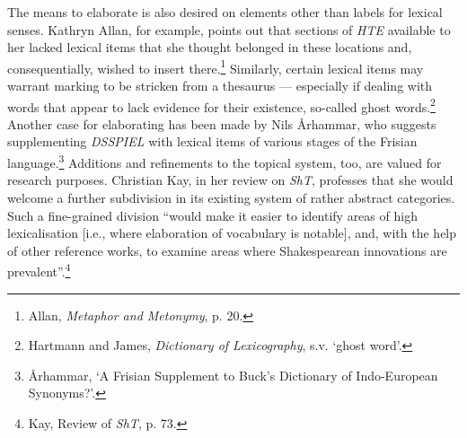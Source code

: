 The means to elaborate is also desired on elements other than labels for lexical senses. Kathryn Allan, for example, points out that sections of \textit{HTE} available to her lacked lexical items that she thought belonged in these locations and, consequentially, wished to insert there.\footnote{Allan, \textit{Metaphor and Metonymy}, p. 20.} Similarly, certain lexical items may warrant marking to be stricken from a thesaurus --- especially if dealing with words that appear to lack evidence for their existence, so-called ghost words.\footnote{Hartmann and James, \textit{Dictionary of Lexicography}, s.v. `ghost word'.}  %
Another case for elaborating has been made by Nils Århammar, who suggests supplementing \textit{DSSPIEL} with lexical items of various stages of the Frisian language.\footnote{Århammar, `A Frisian Supplement to Buck's Dictionary of Indo-European Synonyms?'.} Additions and refinements to the topical system, too, are valued for research purposes. Christian Kay, in her review on \textit{ShT}, professes that she would welcome a further subdivision in its existing system of rather abstract categories. Such a fine-grained division ``would make it easier to identify areas of high lexicalisation [i.e., where elaboration of vocabulary is notable], and, with the help of other reference works, to examine areas where Shakespearean innovations are prevalent''.\footnote{Kay, Review of \textit{ShT}, p. 73.} %

